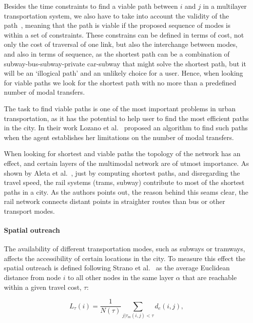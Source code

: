 Besides the time constraints to find a viable path between $i$ and $j$ in a multilayer transportation system, we also have to take into account the validity of the path~\cite{battista1996path, lozano2001path}, meaning that the path is viable if the proposed sequence of modes is within a set of constraints. These constrains can be defined in terms of cost, not only the cost of traversal of one link, but also the interchange between modes, and also in terms of sequence, as the shortest path can be a combination of subway-bus-subway-private car-subway that might solve the shortest path, but it will be an `illogical path' and an unlikely choice for a user. Hence, when looking for viable paths we look for the shortest path with no more than a predefined number of modal transfers.

The task to find viable paths is one of the most important problems in urban transportation, as it has the potential to help user to find the most efficient paths in the city. In their work Lozano et al.~\cite{lozano2001path} proposed an algorithm to find such paths when the agent establishes her limitations on the number of modal transfers.

When looking for shortest and viable paths the topology of the network has an effect, and certain layers of the multimodal network are of utmost importance. As shown by Aleta et al.~\cite{aleta2017transportation}, just by computing shortest paths, and disregarding the travel speed, the rail systems (trams, subway) contribute to most of the shortest paths in a city. As the authors points out, the reason behind this seams clear, the rail network connects distant points in straighter routes than bus or other transport modes. 

\paragraph*{Spatial outreach}
The availability of different transportation modes, such as subways or tramways, affects the accessibility of certain locations in the city. To measure this effect the spatial outreach is defined following Strano et al.~\cite{strano2015features} as the average Euclidean distance from node $i$ to all other nodes in the same layer $\alpha$ that are reachable within a given travel cost, $\tau$:

\begin{equation}
    L_\tau(i)=\frac{1}{N(\tau)}\sum_{j|\tau_{m}(i,j)<\tau}d_e(i,j),
    \label{eq:outreach}
\end{equation}

